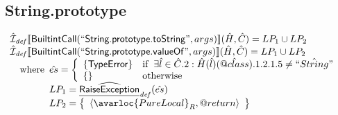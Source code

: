 \subsection{String.prototype}
\[
\begin{array}{l}


\aI_{\it def}\lbr \SF{BuiltintCall}(``\SF{String.prototype.toString}",args)\rbr(\hat{H},\hat{C}) = LP_1 \cup LP_2\\
\aI_{\it def}\lbr \SF{BuiltintCall}(``\SF{String.prototype.valueOf}",args)\rbr(\hat{H},\hat{C}) = LP_1 \cup LP_2\\
\quad\wherec{
  \hat{es} = \left\{\begin{array}{ll}
      \{ \SF{TypeError} \}
      & \ifc{\exists\hat{l}\in\hat{C}.2: \hat{H}(\hat{l})(\avarprop{class}).1.2.1.5 \neq \hat{``String"}}\\
      \set{} & \owc
    \end{array}\right.\\
  LP_1 = \ahf{RaiseException}_{\it def}(\hat{es})\\
  LP_2 = \set{\langle\avarloc{PureLocal}_R,\varprop{return}\rangle}\\
  }\\
\\


\end{array}\]
